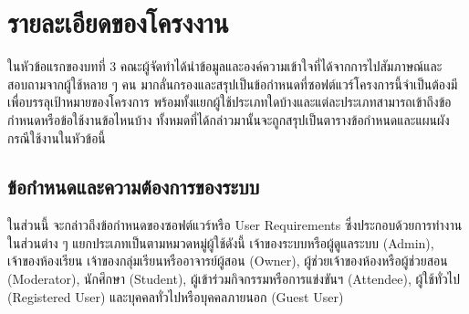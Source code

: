 \documentclass[12pt,one side,openright,a4paper]{cpe-thesis-th}
\newcommand{\thaijustify}[1]{%
  \par\hspace{30pt}\justifying
  #1
}
\begin{document}
\section{รายละเอียดของโครงงาน}
\thaijustify{
  ในหัวข้อแรกของบทที่ 3 คณะผู้จัดทำได้นำข้อมูลและองค์ความเข้าใจที่ได้จากการไปสัมภาษณ์และสอบถามจากผู้ใช้หลาย ๆ คน มากลั่นกรองและสรุปเป็นข้อกำหนดที่ซอฟต์แวร์โครงการนี้จำเป็นต้องมีเพื่อบรรลุเป้าหมายของโครงการ พร้อมทั้งแยกผู้ใช้ประเภทใดบ้างและแต่ละประเภทสามารถเข้าถึงข้อกำหนดหรือข้อใช้งานข้อไหนบ้าง ทั้งหมดที่ได้กล่าวมานั้นจะถูกสรุปเป็นตารางข้อกำหนดและแผนผังกรณีใช้งานในหัวข้อนี้
}
\subsection{ข้อกำหนดและความต้องการของระบบ}
\thaijustify{
  ในส่วนนี้ จะกล่าวถึงข้อกำหนดของซอฟต์แวร์หรือ User Requirements ซึ่งประกอบด้วยการทำงานในส่วนต่าง ๆ แยกประเภทเป็นตามหมวดหมู่ผู้ใช้ดังนี้ เจ้าของระบบหรือผู้ดูแลระบบ (Admin), เจ้าของห้องเรียน เจ้าของกลุ่มเรียนหรืออาจารย์ผู้สอน (Owner), ผู้ช่วยเจ้าของห้องหรือผู้ช่วยสอน (Moderator), นักศึกษา (Student), ผู้เข้าร่วมกิจกรรมหรือการแข่งขันฯ (Attendee), ผู้ใช้ทั่วไป (Registered User) และบุคคลทั่วไปหรือบุคคลภายนอก (Guest User)
}
\end{document}
